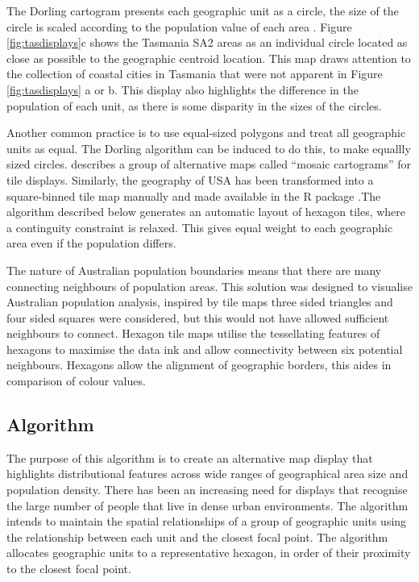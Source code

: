 The Dorling cartogram presents each geographic unit as a circle, the
size of the circle is scaled according to the population value of each
area \citep{ACTUC}. Figure \ref{fig:tasdisplays}c shows the Tasmania SA2
areas as an individual circle located as close as possible to the
geographic centroid location. This map draws attention to the collection
of coastal cities in Tasmania that were not apparent in Figure
\ref{fig:tasdisplays} a or b. This display also highlights the
difference in the population of each unit, as there is some disparity in
the sizes of the circles.

Another common practice is to use equal-sized polygons and treat all
geographic units as equal. The Dorling algorithm can be induced to do
this, to make equallly sized circles. \citet{MDAC} describes a group of
alternative maps called ``mosaic cartograms'' for tile displays.
Similarly, the geography of USA has been transformed into a
square-binned tile map manually and made available in the R package
 \citep{statebins}.The algorithm described below
generates an automatic layout of hexagon tiles, where a continguity
constraint is relaxed. This gives equal weight to each geographic area
even if the population differs.

The nature of Australian population boundaries means that there are many
connecting neighbours of population areas. This solution was designed to
visualise Australian population analysis, inspired by tile maps three
sided triangles and four sided squares were considered, but this would
not have allowed sufficient neighbours to connect. Hexagon tile maps
utilise the tessellating features of hexagons to maximise the data ink
and allow connectivity between six potential neighbours. Hexagons allow
the alignment of geographic borders, this aides in comparison of colour
values.

\hypertarget{algorithm}{%
\subsection{Algorithm}\label{algorithm}}

The purpose of this algorithm is to create an alternative map display
that highlights distributional features across wide ranges of
geographical area size and population density. There has been an
increasing need for displays that recognise the large number of people
that live in dense urban environments. The algorithm intends to maintain
the spatial relationships of a group of geographic units using the
relationship between each unit and the closest focal point. The
algorithm allocates geographic units to a representative hexagon, in
order of their proximity to the closest focal point.

